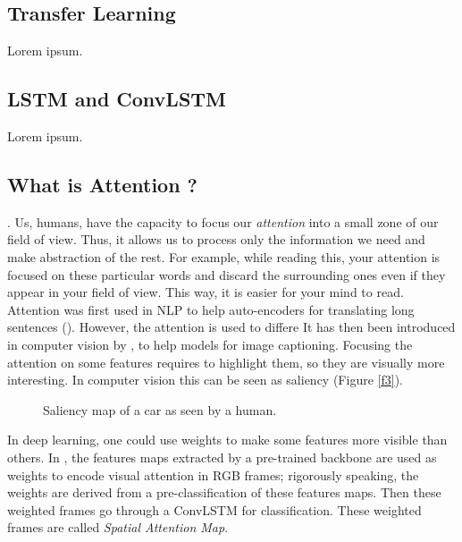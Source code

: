 \documentclass[12pt, a4paper]{report}
\begin{document}
			\subsection{Transfer Learning}\label{tl}
				Lorem ipsum.
			
			\subsection{LSTM and ConvLSTM}\label{lstm}
				Lorem ipsum.
			
			\subsection{What is Attention ?}\label{attention}
				 \cite{sudhakaran}.
				Us, humans, have the capacity to focus our {\itshape attention} into a small zone of our field of view.
				Thus, it allows us to process only the information we need and make abstraction of the rest.
				For example, while reading this, your attention is focused on these particular words and discard the surrounding ones even if they appear in your field of view.
				This way, it is easier for your mind to read.
				Attention was first used in NLP to help auto-encoders for translating long sentences (\cite{bahdanau}).
				However, the attention is used to differe
				It has then been introduced in computer vision by \cite{xu}, to help models for image captioning.
				Focusing the attention on some features requires to highlight them, so they are visually more interesting.
				In computer vision this can be seen as \gls{saliency} (Figure \ref{f3}).
				\begin{figure}[!tbp]
					\centering
					\caption{Saliency map of a car as seen by a human.}
				\end{figure}
				In deep learning, one could use weights to make some features more visible than others.
				In \cite{sudhakaran_lanz}, the features maps extracted by a pre-trained backbone are used as weights to encode visual attention in RGB frames; rigorously speaking, the weights are derived from a pre-classification of these features maps.
				Then these weighted frames go through a ConvLSTM for classification.
				These weighted frames are called {\itshape Spatial Attention Map}.
	
\end{document}
